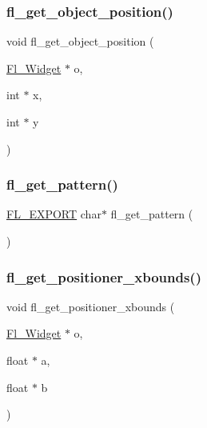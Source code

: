 \mbox{\label{forms_8_h_a554b7463f3b776c429f82cf581151c9b}} 
\subsubsection{\texorpdfstring{fl\+\_\+get\+\_\+object\+\_\+position()}{fl\_get\_object\_position()}}
{\footnotesize\ttfamily void fl\+\_\+get\+\_\+object\+\_\+position (\begin{DoxyParamCaption}\item[{\hyperlink{class_fl___widget}{Fl\+\_\+\+Widget} $\ast$}]{o,  }\item[{int $\ast$}]{x,  }\item[{int $\ast$}]{y }\end{DoxyParamCaption})\hspace{0.3cm}{\ttfamily [inline]}}

\mbox{\label{forms_8_h_a6c2b7f1115fef0ae936847e492be3ff7}} 
\subsubsection{\texorpdfstring{fl\+\_\+get\+\_\+pattern()}{fl\_get\_pattern()}}
{\footnotesize\ttfamily \hyperlink{_fl___export_8_h_aa9ba29a18aee9d738370a06eeb4470fc}{F\+L\+\_\+\+E\+X\+P\+O\+RT} char$\ast$ fl\+\_\+get\+\_\+pattern (\begin{DoxyParamCaption}{ }\end{DoxyParamCaption})}

\mbox{\label{forms_8_h_a88f110a39ed4e60bf4cb8a47987da4fa}} 
\subsubsection{\texorpdfstring{fl\+\_\+get\+\_\+positioner\+\_\+xbounds()}{fl\_get\_positioner\_xbounds()}}
{\footnotesize\ttfamily void fl\+\_\+get\+\_\+positioner\+\_\+xbounds (\begin{DoxyParamCaption}\item[{\hyperlink{class_fl___widget}{Fl\+\_\+\+Widget} $\ast$}]{o,  }\item[{float $\ast$}]{a,  }\item[{float $\ast$}]{b }\end{DoxyParamCaption})\hspace{0.3cm}{\ttfamily [inline]}}

